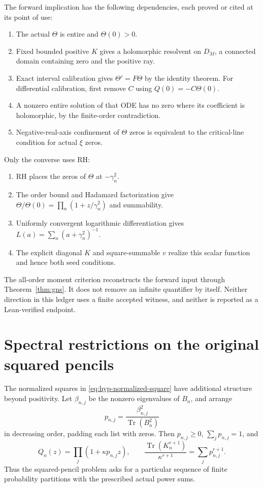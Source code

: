 \documentclass[11pt,a4paper]{article}
\numberwithin{equation}{section}
\theoremstyle{definition}
\theoremstyle{remark}
\DeclareMathOperator{\Tr}{Tr}
\begin{document}
The forward implication has the following dependencies, each proved
or cited at its point of use:
\begin{enumerate}[label=\textbf{F\arabic*.},leftmargin=2.8em]
\item The actual $\Theta$ is entire and $\Theta(0)>0$.
\item Fixed bounded positive $K$ gives a holomorphic resolvent on
      $D_M$, a connected domain containing zero and the positive ray.
\item Exact interval calibration gives $\Theta'=F\Theta$ by the
      identity theorem. For differential calibration, first remove
      $C$ using $Q(0)=-C\Theta(0)$.
\item A nonzero entire solution of that ODE has no zero where its
      coefficient is holomorphic, by the finite-order contradiction.
\item Negative-real-axis confinement of $\Theta$ zeros is equivalent
      to the critical-line condition for actual $\xi$ zeros.
\end{enumerate}
Only the converse uses RH:
\begin{enumerate}[label=\textbf{R\arabic*.},leftmargin=2.8em]
\item RH places the zeros of $\Theta$ at $-\gamma_n^2$.
\item The order bound and Hadamard factorization give
      $\Theta/\Theta(0)=\prod_n(1+z/\gamma_n^2)$ and summability.
\item Uniformly convergent logarithmic differentiation gives
      $L(a)=\sum_n(a+\gamma_n^2)^{-1}$.
\item The explicit diagonal $K$ and square-summable $v$ realize this
      scalar function and hence both seed conditions.
\end{enumerate}
The all-order moment criterion reconstructs the forward input through
Theorem~\ref{thm:gns}. It does not remove an infinite quantifier by
itself. Neither direction in this ledger uses a finite accepted
witness, and neither is reported as a Lean-verified endpoint.

\section[Limits of squared pencils]{Spectral restrictions on the original squared pencils}\label{app:pencil-limits}

The normalized squares in \eqref{eq:hyp-normalized-square} have additional
structure beyond positivity. Let $\beta_{n,j}$ be the nonzero eigenvalues
of $B_n$, and arrange
\begin{equation}\label{can-pencil-partition}
p_{n,j}=\frac{\beta_{n,j}^2}{\Tr(B_n^2)}
\end{equation}
in decreasing order, padding each list with zeros. Then
$p_{n,j}\geq0$, $\sum_jp_{n,j}=1$, and
\begin{equation}\label{can-pencil-products}
Q_n(z)=\prod_j(1+\kappa p_{n,j}z),\qquad
\frac{\Tr(K_n^{r+1})}{\kappa^{r+1}}=\sum_jp_{n,j}^{r+1}.
\end{equation}
Thus the squared-pencil problem asks for a particular sequence of
finite probability partitions with the prescribed actual power sums.
\end{document}
